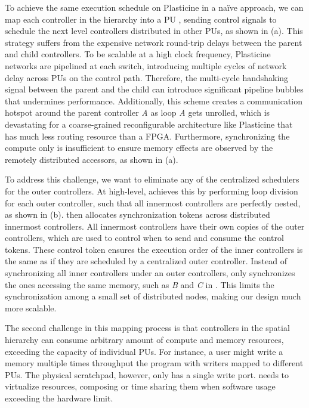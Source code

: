 To achieve the same execution schedule on Plasticine in a na\"ive approach, 
we can map each controller in the hierarchy into a PU
, sending control signals to schedule the next level 
controllers distributed in other PUs, as shown in  (a).
This strategy suffers from the expensive network round-trip delays between the parent and child controllers.
To be scalable at a high clock frequency, Plasticine networks are pipelined at each switch,
introducing multiple cycles of network delay across PUs on the control path.
Therefore, the multi-cycle handshaking signal between the parent and the child can introduce significant pipeline bubbles
that undermines performance.
Additionally, this scheme creates a communication hotspot around the parent controller \emph{A} as
loop \emph{A} gets unrolled, which is devastating for a coarse-grained reconfigurable architecture
like Plasticine that has much less routing resource than a FPGA.
Furthermore, synchronizing the compute only is insufficient to ensure memory effects are observed by
the remotely distributed accessors, as shown in  (a).

To address this challenge, we want to eliminate any of the centralized schedulers for the outer
controllers.
At high-level, \name achieves this by performing loop division for each outer controller, such that
all innermost controllers are perfectly nested, as shown in  (b).
\name then allocates synchronization tokens across distributed innermost controllers.
All innermost controllers have their own copies of the outer controllers, which are used
to control when to send and consume the control tokens.
These control token ensures the execution order of the inner controllers is the same as if they are
scheduled by a centralized outer controller. Instead of synchronizing all inner controllers under an
outer controllers, \name only synchronizes the ones accessing the same memory, such as \emph{B} and
\emph{C} in . This limits the synchronization among a small set of distributed nodes, 
making our design much more scalable.

The second challenge in this mapping process is that controllers in the spatial hierarchy
can consume arbitrary amount of compute and memory resources, exceeding the capacity of individual
PUs. For instance, a user might write a memory multiple times throughput the program with writers 
mapped to different PUs. The physical scratchpad, however, only has a single write
port. \name needs to virtualize resources, composing or time sharing them when software usage
exceeding the hardware limit.

